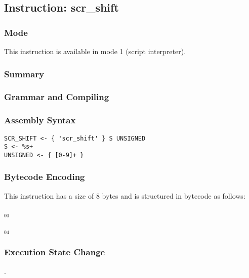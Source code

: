\subsection{Instruction: scr\_shift}

\subsubsection{Mode}
This instruction is available in mode 1 (script interpreter).
\subsubsection{Summary}


\subsubsection{Grammar and Compiling}


\subsubsection{Assembly Syntax}

\begin{myquote}
\begin{verbatim}
SCR_SHIFT <- { 'scr_shift' } S UNSIGNED
S <- %s+
UNSIGNED <- { [0-9]+ }
\end{verbatim}
\end{myquote}

\subsubsection{Bytecode Encoding}

This instruction has a size of 8 bytes and is structured in bytecode as follows:

$_{00}$\ 



$_{04}$\ 


\subsubsection{Execution State Change}

.


